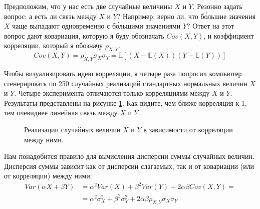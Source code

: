 Предположим, что у нас есть две случайные величины $X$ и $Y$. Резонно задать 
вопрос: а есть ли связь между $X$ и $Y$? Например, верно ли, что б\'{о}льшие 
значения $X$ чаще выпадают одновременно с б\'{о}льшими значениями $Y$? Ответ на 
этот вопрос дают ковариация, которую я буду обозначать $Cov(X,Y)$, и коэффициент 
корреляции, который я обозначу $\rho_{X,Y}$.
\begin{equation*}
Cov(X,Y) = \rho_{X,Y}\sigma_X\sigma_Y 
= \mathbb{E}\left[(X - \mathbb{E}(X))(Y - \mathbb{E}(Y)) \right]
\end{equation*}

Чтобы визуализировать идею корреляции, я четыре раза попросил компьютер 
сгенерировать по 250 случайных реализаций стандартных нормальных величин $X$ и 
$Y$. Четыре эксперимента отличаются только корреляциями между $X$ и $Y$. 
Результаты представлены на рисунке \ref{covariance_example}. Как видите, чем 
ближе корреляция к 1, тем очевиднее линейная связь между $X$ и $Y$.

\begin{figure}[ht]
\centering
{}
\caption{Реализации случайных величин $X$ и $Y$ в зависимости от корреляции 
между ними.}
\label{covariance_example}
\end{figure}

Нам понадобится правило для вычисления дисперсии суммы случайных величин. 
Дисперсия суммы зависит как от дисперсии слагаемых, так и от ковариации (или от 
корреляции) между ними:
\begin{align}
Var(\alpha X + \beta Y)
&=
\alpha^2 Var(X) + \beta^2 Var(Y) + 2 \alpha \beta Cov(X, Y) = \nonumber \\
&=
\alpha^2\sigma_X^2 + \beta^2 \sigma_Y^2 
+ 2\alpha\beta\rho_{X,Y}\sigma_X\sigma_Y
\label{variance_of_linear_combination}
\end{align}

